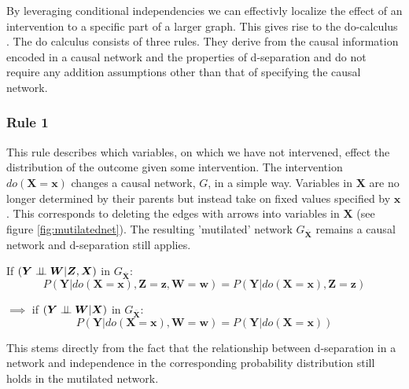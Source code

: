 \documentclass[11pt,a4paper,oneside]{book}
\begin{document}
By leveraging conditional independencies we can effectivly localize the effect of an intervention to a specific part of a larger graph. This gives rise to the do-calculus \cite{Pearl2000}. The do calculus consists of three rules. They derive from the causal information encoded in a causal network and the properties of d-separation and do not require any addition assumptions other than that of specifying the causal network. 

\subsubsection*{Rule 1}
This rule describes which variables, on which we have not intervened, effect the distribution of the outcome given some intervention. The intervention $do(\boldsymbol{X}=\boldsymbol{x})$ changes a causal network, $G$, in a simple way. Variables in $\boldsymbol{X}$ are no longer determined by their parents but instead take on fixed values specified by $\boldsymbol{x}$. This corresponds to deleting the edges with arrows into variables in $\boldsymbol{X}$  (see figure \ref{fig:mutilatednet}). The resulting 'mutilated' network $G_{\overline{\boldsymbol{X}}}$ remains a causal network and d-separation still applies. 

If $(\boldsymbol{Y} \perp\!\!\!\perp \boldsymbol{W} | \boldsymbol{Z},\boldsymbol{X})$ in $G_{\overline{\boldsymbol{X}}}$:
\begin{equation}
\label{eq:Do1}
 P(\boldsymbol{Y}|do(\boldsymbol{X}=\boldsymbol{x}),\boldsymbol{Z}=\boldsymbol{z},\boldsymbol{W}=\boldsymbol{w}) = P(\boldsymbol{Y}|do(\boldsymbol{X}=\boldsymbol{x}),\boldsymbol{Z}=\boldsymbol{z}) 
\end{equation}

$\implies$ if $(\boldsymbol{Y} \perp\!\!\!\perp \boldsymbol{W} | \boldsymbol{X})$ in $G_{\overline{\boldsymbol{X}}}$:
\begin{equation}
\label{eq:Do12}
 P(\boldsymbol{Y}|do(\boldsymbol{X}=\boldsymbol{x}),\boldsymbol{W}=\boldsymbol{w}) = P(\boldsymbol{Y}|do(\boldsymbol{X}=\boldsymbol{x})) 
\end{equation}

This stems directly from the fact that the relationship between d-separation in a network and independence in the corresponding probability distribution still holds in the mutilated network. 
\end{document}
